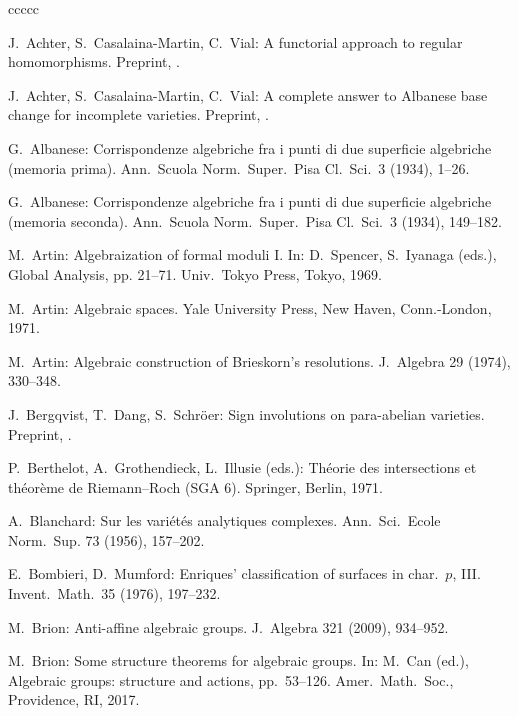 \documentclass[oneside, 12pt]{amsart}
\theoremstyle{definition}
\theoremstyle{remark}
\begin{document}
\begin{thebibliography}{ccccc}

J.\ Achter, S.\ Casalaina-Martin, C.\ Vial:
A functorial approach to regular homomorphisms.
Preprint, .

J.\ Achter, S.\ Casalaina-Martin, C.\ Vial:
A complete answer to Albanese base change for incomplete varieties.
Preprint, .

G.\ Albanese:
Corrispondenze algebriche fra i punti di due superficie algebriche (memoria prima). 
Ann.\ Scuola Norm.\ Super.\ Pisa Cl.\ Sci.\ 3 (1934),  1--26.

G.\ Albanese:
Corrispondenze algebriche fra i punti di due superficie algebriche (memoria seconda). 
Ann.\ Scuola Norm.\ Super.\ Pisa Cl.\ Sci.\ 3 (1934), 149--182. 

M.\ Artin: 
Algebraization of formal moduli I. 
In:  
D.\ Spencer, S.\ Iyanaga (eds.),
Global Analysis, pp. 21--71.
Univ.\ Tokyo Press, Tokyo, 1969. 

M.\ Artin:
Algebraic spaces.
Yale University Press, New Haven, Conn.-London, 1971.

M.\ Artin: 
Algebraic construction of Brieskorn's resolutions. 
J.\ Algebra 29 (1974), 330--348.

J.\  Bergqvist, T.\ Dang, S.\ Schr\"oer:
Sign involutions on para-abelian varieties.
Preprint, .

P.\ Berthelot, A.\ Grothendieck, L.\ Illusie (eds.):
Th\'eorie des intersections et th\'eor\`eme de Riemann--Roch (SGA 6).
Springer, Berlin, 1971.

A.\ Blanchard:
Sur les vari\'et\'es analytiques complexes.  
Ann.\ Sci.\ Ecole Norm.\ Sup. 73 (1956), 157--202. 

E.\ Bombieri, D.\ Mumford:
Enriques' classification of surfaces in char.\ $p$,  III.
Invent.\ Math.\ 35  (1976), 197--232.

M.\ Brion:
Anti-affine algebraic groups. 
J.\ Algebra 321 (2009),  934--952. 

M.\ Brion:
Some structure theorems for algebraic groups.
In:
M.\ Can (ed.),  Algebraic groups: structure and actions, pp.\ 53--126.
Amer.\ Math.\ Soc., Providence, RI, 2017. 


\end{thebibliography}
\end{document}
